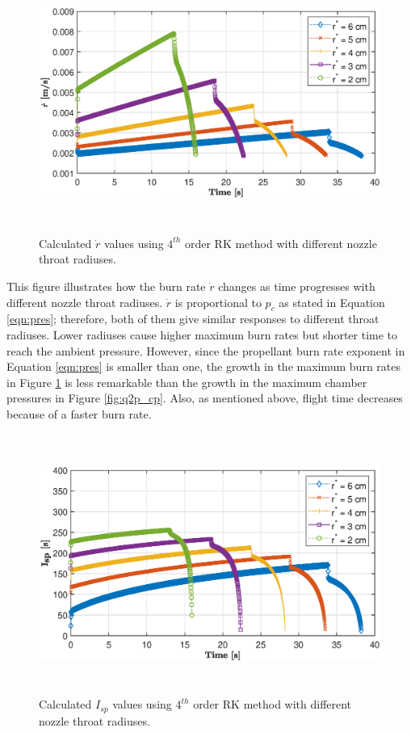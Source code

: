 \documentclass[letterpaper,12pt]{article}
\begin{document}
\newpage
\begin{figure}[!h]
	\centering
	\includegraphics[height = 8.5cm]{graphs/q2_rdot.eps}
	\caption{Calculated $\dot{r}$ values using $4^{th}$ order RK method with different nozzle throat radiuses.}
	\label{fig:q2r_dot}
\end{figure}

This figure illustrates how the burn rate $\dot{r}$ changes as time progresses with different nozzle throat radiuses.
$\dot{r}$ is proportional to $p_c$ as stated in Equation \ref{eqn:pres}; therefore, both of them give 
similar responses to different throat radiuses. 
Lower radiuses cause higher maximum burn rates but shorter time to reach the ambient pressure. 
However, since the propellant burn rate exponent in 
Equation \ref{eqn:pres} is smaller than one, the growth in the maximum burn rates in Figure \ref{fig:q2r_dot} is 
less remarkable than the growth in the maximum chamber pressures in Figure \ref{fig:q2p_cp}. Also, as mentioned above,
flight time decreases because of a faster burn rate.

\newpage

\begin{figure}[!h]
	\centering
	\includegraphics[height = 8.5cm]{graphs/q2_isp.eps}
	\caption{Calculated $I_{sp}$ values using $4^{th}$ order RK method with different nozzle throat radiuses.}
	\label{fig:q2I_sp}
\end{figure}
\end{document}
